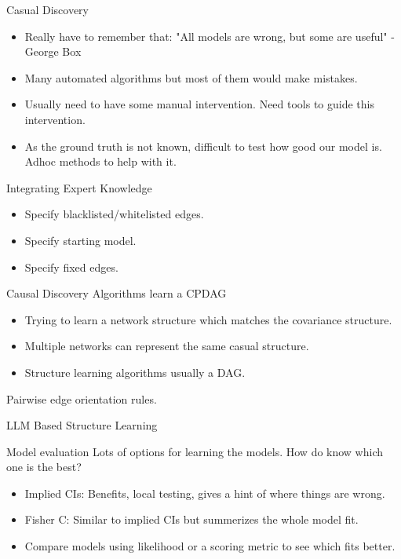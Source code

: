 \documentclass{beamer}
\begin{document}
\begin{frame}{Casual Discovery}
	\begin{itemize}
		\item Really have to remember that: "All models are wrong, but some are useful" - George Box
		\item Many automated algorithms but most of them would make mistakes.
		\item Usually need to have some manual intervention. Need tools to guide this intervention.
		\item As the ground truth is not known, difficult to test how good our model is. Adhoc methods to help with it.
	\end{itemize}
\end{frame}

\begin{frame}{Integrating Expert Knowledge}
	\begin{itemize}
		\item Specify blacklisted/whitelisted edges.
		\item Specify starting model.
		\item Specify fixed edges.
	\end{itemize}
\end{frame}

\begin{frame}{Causal Discovery Algorithms learn a CPDAG}
	\begin{itemize}
		\item Trying to learn a network structure which matches the covariance
			structure.
		\item Multiple networks can represent the same casual structure.
		\item Structure learning algorithms usually a DAG.
	\end{itemize}

	Pairwise edge orientation rules.
\end{frame}

\begin{frame}
\end{frame}

\begin{frame}{LLM Based Structure Learning}
\end{frame}

\begin{frame}{Model evaluation}
	Lots of options for learning the models. How do know which one is the best?
	\begin{itemize}
		\item Implied CIs: Benefits, local testing, gives a hint of where things are wrong.
		\item Fisher C: Similar to implied CIs but summerizes the whole model fit.
		\item Compare models using likelihood or a scoring metric to see which fits better.
	\end{itemize}
\end{frame}
\end{document}
